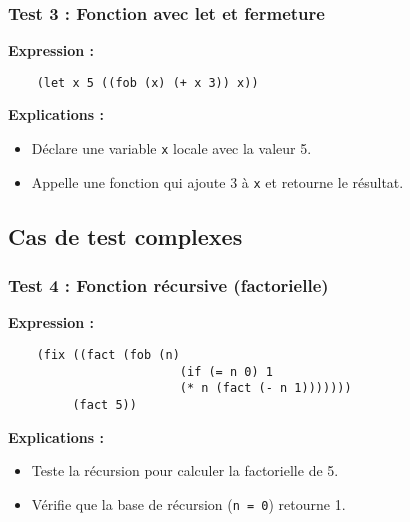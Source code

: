\documentclass{article}
\begin{document}
\subsubsection*{Test 3 : Fonction avec let et fermeture} 
\hspace{.5cm}\textbf{Expression :} 
\begin{verbatim} 
    (let x 5 ((fob (x) (+ x 3)) x)) 
\end{verbatim} 
\hspace{.5cm}\textbf{Explications :} 
\begin{itemize} 
    \item Déclare une variable \texttt{x} locale avec la valeur 5. 
    \item Appelle une fonction qui ajoute 3 à \texttt{x} et retourne le résultat. 
\end{itemize}

\subsection{Cas de test complexes}
\subsubsection*{Test 4 : Fonction récursive (factorielle)} 
\hspace{.5cm}\textbf{Expression :} 
\begin{verbatim} 
    (fix ((fact (fob (n) 
                        (if (= n 0) 1 
                        (* n (fact (- n 1))))))) 
         (fact 5)) 
\end{verbatim} 
\hspace{.5cm}\textbf{Explications :} 
\begin{itemize} 
    \item Teste la récursion pour calculer la factorielle de 5. 
    \item Vérifie que la base de récursion (\texttt{n = 0}) retourne 1. 
\end{itemize}
\end{document}
